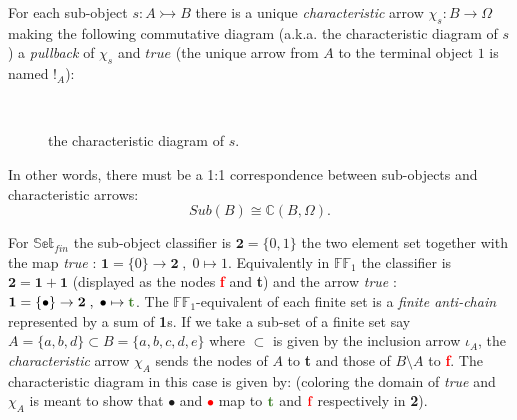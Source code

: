 \begin{definition}
	For each sub-object $s : A \rightarrowtail B $ there is a unique \emph{characteristic} arrow $\chi_s : B \rightarrow \Omega$ making the following commutative diagram (a.k.a. the characteristic diagram of $s$) a \emph{pullback} of $\chi_s$ and $true$ (the unique arrow from $A$ to the terminal object $1$ is named $!_A$):
	\begin{figure}[h]
		\centering 
		\
		\caption{the characteristic diagram of $s$.}
	\end{figure}   
	In other words, there must be a 1:1 correspondence between sub-objects and characteristic arrows:
	\begin{equation*}
		Sub(B) \cong \mathbb{C}(B,\Omega).
	\end{equation*}
	
\end{definition}


For $\mathbb{Set}_{fin}$ the sub-object classifier is $\textbf{2} = \{0,1\}$ the two element set together with the map \emph{true} : $ \textbf{1} = \{0\} \rightarrow \textbf{2} \;,  \; 0 \mapsto 1$. \newline
 Equivalently in $\mathbb{FF}_1$ the classifier is $\textbf{2} = \textbf{1} + \textbf{1}$ (displayed as the nodes \textcolor{red}{\textbf{f}} and \textcolor{OliveGreen}{\textbf{t}}) and the arrow \emph{true} : $ \textbf{1} = \{\bullet\} \rightarrow \textbf{2} \;,  \; \bullet \mapsto \textcolor{OliveGreen}{\textbf{t}}$. \newline
 The $\mathbb{FF}_1$-equivalent of each finite set is a \emph{finite anti-chain} represented by a sum of \textbf{1}s. \newline
  If we take a sub-set of a finite set say $A=\{a,b,d\} \subset B=\{a,b,c,d,e\}$ where $\subset$ is given by the inclusion arrow $\iota_A$, the \emph{characteristic} arrow $\chi_A$ sends the nodes of $A$ to \textcolor{OliveGreen}{\textbf{t}} and those of $B \setminus A$ to \textcolor{red}{\textbf{f}}. \newline The characteristic diagram in this case is given by: (coloring the domain of \emph{true} and $\chi_A$ is meant to show that \textcolor{OliveGreen}{$\bullet$} and \textcolor{red}{$\bullet$} map to $\textcolor{OliveGreen}{\textbf{t}}$ and $\textcolor{red}{\textbf{f}}$ respectively in \textbf{2}).


